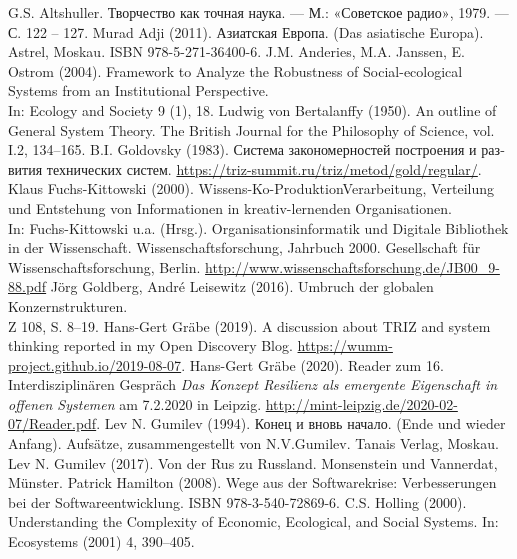 \documentclass[11pt,a4paper]{article}
\begin{document}
\begin{thebibliography}{xxx}
 G.S. Altshuller. \foreignlanguage{russian}{Творчество
  как точная наука. — М.: «Советское радио»}, 1979. — С. 122 – 127.
 Murad Adji (2011). \foreignlanguage{russian}{Азиатская
  Европа}. (Das asiatische Europa).  Astrel, Moskau. ISBN 978-5-271-36400-6.
 J.M. Anderies, M.A. Janssen, E. Ostrom (2004).
  Framework to Analyze the Robustness of Social-ecological Systems from an
  Institutional Perspective.\\ In: Ecology and Society 9 (1), 18.
 Ludwig von Bertalanffy (1950). An outline of General
  System Theory. The British Journal for the Philosophy of Science, vol. I.2,
  134–165.
 B.I. Goldovsky (1983).
  \foreignlanguage{russian}{Система закономерностей построения и развития
    технических систем}.
  \url{https://triz-summit.ru/triz/metod/gold/regular/}.
 Klaus Fuchs-Kittowski (2000).
  Wissens-Ko-ProduktionVerarbeitung, Verteilung und Entstehung von
  Informationen in kreativ-lernenden Organisationen.\\ In: Fuchs-Kittowski
  u.a. (Hrsg.). Organisationsinformatik und Digitale Bibliothek in der
  Wissenschaft. Wissenschaftsforschung, Jahrbuch 2000. Gesellschaft für
  Wissenschaftsforschung, Berlin.
  \url{http://www.wissenschaftsforschung.de/JB00_9-88.pdf}
 Jörg Goldberg, André Leisewitz (2016). Umbruch der
  globalen Konzernstrukturen.\\ Z 108, S. 8--19.
 Hans-Gert Gräbe (2019).  A discussion about TRIZ
    and system thinking reported in my Open Discovery Blog.
    \url{https://wumm-project.github.io/2019-08-07}.
 Hans-Gert Gräbe (2020). Reader zum 16. Interdisziplinären
  Gespräch \emph{Das Konzept Resilienz als emergente Eigenschaft in offenen
    Systemen} am 7.2.2020 in Leipzig.
  \url{http://mint-leipzig.de/2020-02-07/Reader.pdf}.
 Lev N. Gumilev (1994). \foreignlanguage{russian}{Конец и
  вновь начало}.  (Ende und wieder Anfang).  Aufsätze, zusammengestellt von
  N.V.Gumilev. Tanais Verlag, Moskau.
 Lev N. Gumilev (2017). Von der Rus zu Russland.
  Monsenstein und Vannerdat, Münster.
 Patrick Hamilton (2008). Wege aus der Softwarekrise:
  Verbesserungen bei der Softwareentwicklung. ISBN 978-3-540-72869-6.
 C.S. Holling (2000). Understanding the Complexity of
  Economic, Ecological, and Social Systems. In: Ecosystems (2001) 4, 390–405.

\end{thebibliography}
\end{document}
